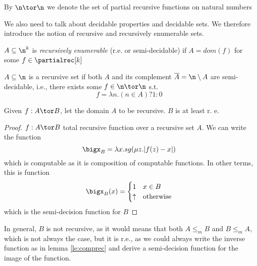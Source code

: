\begin{notation}
  By \(\n \tor \n\) we denote the set of partial recursive functions
  on natural numbers
\end{notation}

We also need to talk about decidable properties and decidable sets. We
therefore introduce the notion of recursive and recursively enumerable
sets.

\begin{definition}
  \(A \subseteq \n^k\) is \emph{recursively enumerable} (r.e. or
  semi-decidable) if \(A = dom(f)\) for some \(f \in \partialrec[k]\)
\end{definition}

\begin{definition}
  \(A\subseteq \n\) is a recursive set if both \(A\) and its
  complement \(\overline{A} = \n \setminus A\) are semi-decidable,
  i.e., there exists some \(f \in \n \tor \n\) s.t. \[f = \lambda n
  . (n \in A) ? 1 : 0\]
\end{definition}

\begin{lemma}\label{le:comprec}
  Given \(f : A \tor B\), let the domain \(A\) to be recursive. \(B\)
  is at least r. e.
\end{lemma}

\begin{proof}
  \(f : A \tor B\) total recursive function over a recursive set
  \(A\). We can write the function \[\bigx_B = \lambda x . sg(\mu z
  . |f(z) - x|)\] which is computable as it is composition of
  computable functions. In other terms, this is function
  \[\bigx_B(x)
  = \begin{cases}
    1 & x \in B \\
    \uparrow & \text{otherwise}
  \end{cases}\]
  which is the semi-decision function for \(B\)
\end{proof}

\begin{observation}\label{obs:comprec}
  In general, \(B\) is not recursive, as it would means that both \(A
  \leq_m B\) and \(B \leq_m A\), which is not always the case, but it
  is r.e., as we could always write the inverse function as in lemma
  \ref{le:comprec} and derive a semi-decision function for the image
  of the function.
\end{observation}
